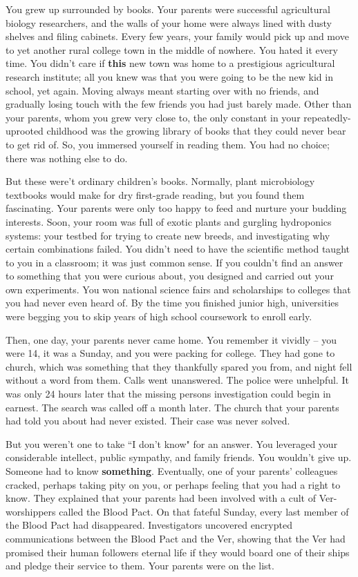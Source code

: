 \documentclass[char]{guildcamp4}
\begin{document}
\name{\cSpite{}}

You grew up surrounded by books. Your parents were successful agricultural biology researchers, and the walls of your home were always lined with dusty shelves and filing cabinets. Every few years, your family would pick up and move to yet another rural college town in the middle of nowhere. You hated it every time. You didn't care if {\bf this} new town was home to a prestigious agricultural research institute; all you knew was that you were going to be the new kid in school, yet again. Moving always meant starting over with no friends, and gradually losing touch with the few friends you had just barely made. Other than your parents, whom you grew very close to, the only constant in your repeatedly-uprooted childhood was the growing library of books that they could never bear to get rid of. So, you immersed yourself in reading them. You had no choice; there was nothing else to do.

But these were't ordinary children's books. Normally, plant microbiology textbooks would make for dry first-grade reading, but you found them fascinating. Your parents were only too happy to feed and nurture your budding interests. Soon, your room was full of exotic plants and gurgling hydroponics systems: your testbed for trying to create new breeds, and investigating why certain combinations failed. You didn't need to have the scientific method taught to you in a classroom; it was just common sense. If you couldn't find an answer to something that you were curious about, you designed and carried out your own experiments. You won national science fairs and scholarships to colleges that you had never even heard of. By the time you finished junior high, universities were begging you to skip years of high school coursework to enroll early. 

Then, one day, your parents never came home. You remember it vividly -- you were 14, it was a Sunday, and you were packing for college. They had gone to church, which was something that they thankfully spared you from, and night fell without a word from them. Calls went unanswered. The police were unhelpful. It was only 24 hours later that the missing persons investigation could begin in earnest. The search was called off a month later. The church that your parents had told you about had never existed. Their case was never solved.

But you weren't one to take ``I don't know" for an answer. You leveraged your considerable intellect, public sympathy, and family friends. You wouldn't give up. Someone had to know {\bf something}. Eventually, one of your parents' colleagues cracked, perhaps taking pity on you, or perhaps feeling that you had a right to know. They explained that your parents had been involved with a cult of Ver-worshippers called the Blood Pact. On that fateful Sunday, every last member of the Blood Pact had disappeared. Investigators uncovered encrypted communications between the Blood Pact and the Ver, showing that the Ver had promised their human followers eternal life if they would board one of their ships and pledge their service to them. Your parents were on the list.
\end{document}
